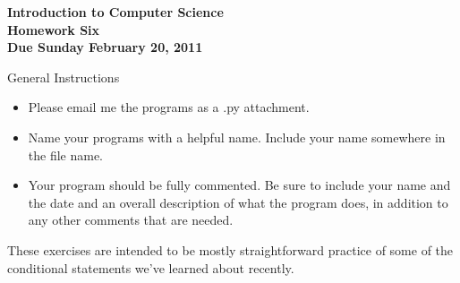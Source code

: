 \documentclass[12pt]{article}
\begin{document}
\pagestyle{empty}
 
\begin{center}
{\large {\bf Introduction to Computer Science}}\\
\medskip
{\large {\bf Homework Six}}\\
\medskip
{ {\bf Due Sunday February 20, 2011}}\\ 
\end{center}


\noindent General Instructions

\begin{itemize}
\setlength{\itemsep}{-1mm}
  \item Please email me the programs as a .py attachment.
  \item Name your programs with a helpful name.  Include your name
    somewhere in the file name.
  \item Your program should be fully commented.  Be sure to include
    your name and the date and an overall description of what the
    program does, in addition to any other comments that are needed. \\
\end{itemize}



\noindent These exercises are intended to be mostly straightforward
practice of some of the conditional statements we've learned about
recently.  \\
\end{document}
